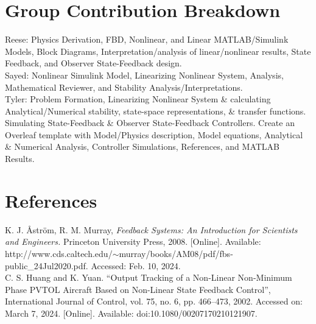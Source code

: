 \documentclass[conference]{IEEEtran}
\begin{document}
\section{Group Contribution Breakdown}
Reese: Physics Derivation, FBD, Nonlinear, and Linear MATLAB/Simulink Models, Block Diagrams, Interpretation/analysis of linear/nonlinear results, State Feedback, and Observer State-Feedback design.\\

Sayed: Nonlinear Simulink Model, Linearizing Nonlinear System, Analysis, Mathematical Reviewer, and Stability Analysis/Interpretations.  \\

Tyler: Problem Formation, Linearizing Nonlinear System \& calculating Analytical/Numerical stability, state-space representations, \& transfer functions. Simulating State-Feedback \& Observer State-Feedback Controllers. Create an Overleaf template with Model/Physics description, Model equations, Analytical \& Numerical Analysis, Controller Simulations, References, and MATLAB Results. \\

\section{References}
\noindent [1] K. J. Åström, R. M. Murray, \textit{Feedback Systems: An Introduction for Scientists and Engineers.} Princeton University Press, 2008. [Online]. Available: http://www.cds.caltech.edu/$\sim$murray/books/AM08/pdf/fbs-public\_24Jul2020.pdf. 
Accessed: Feb. 10, 2024. \\

\noindent [2] C. S. Huang and K. Yuan.
“Output Tracking of a Non-Linear Non-Minimum Phase PVTOL Aircraft Based on Non-Linear State Feedback Control”, International Journal of Control, vol. 75, no. 6, pp. 466–473, 2002. Accessed on: March 7, 2024. [Online]. Available: doi:10.1080/00207170210121907.\\
\end{document}
